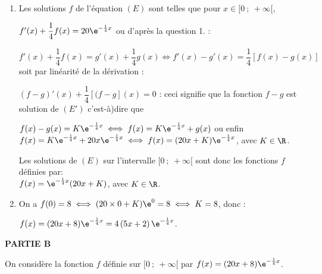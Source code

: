 \begin{enumerate}
$f(x) = K\e^{-\frac14 x}$, avec $K \in \R$.

\item %
Les solutions $f$ de l'équation $(E)$ sont telles que pour $x \in [0~;~+ \infty[$, 

$f'(x) + \dfrac14f(x) = 20\e^{- \frac14 x}$ ou d'après la question 1. :

$f'(x) + \dfrac14f(x) = g'(x) + \dfrac14g(x) \iff f'(x) - g'(x) = \dfrac14[f(x) - g(x)]$ soit par linéarité de la dérivation :

$(f - g)'(x) + \dfrac14[(f - g ](x) = 0$ : ceci signifie que la fonction $f - g$ est solution de $(E')$ c'est-à)dire que 

$f(x) - g(x) = K\e^{-\frac14 x} \iff f(x) = K\e^{-\frac14 x} + g(x)$ ou enfin 
$f(x) = K\e^{-\frac14 x} + 20x\e^{-\frac14 x}\iff f(x) = (20x + K)\e^{-\frac14 x}$, avec $K \in \R$.

Les solutions de $(E)$ sur l'intervalle $[0~;~ +\infty[$ sont donc les fonctions $f$ définies par:\\
$f(x) = \e^{-\frac14 x}(20x + K)$, avec  $K \in \R$.

\item %
On a $f(0) = 8 \iff (20 \times 0 + K)\e^{0} = 8 \iff K = 8$, donc :

$f(x) = (20x + 8)\e^{-\frac14 x} = 4\left (5x + 2\right )\e^{-\frac14 x}$.
\end{enumerate}

\bigskip

\textbf{PARTIE B}

\medskip

On considère la fonction $f$ définie sur $[0~;~ +\infty[$ par 
$f(x) = (20x + 8)\e^{-\frac14 x}$.



